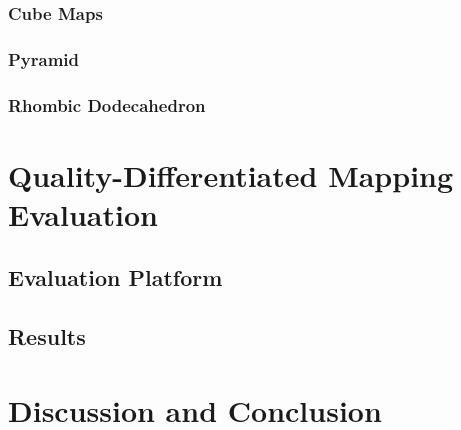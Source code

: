 \documentclass{sig-alternate}
\begin{document}
\subsubsection{Cube Maps}

\subsubsection{Pyramid}

\subsubsection{Rhombic Dodecahedron}

\section{Quality-Differentiated Mapping Evaluation}

\subsection{Evaluation Platform}

\subsection{Results}

\section{Discussion and Conclusion}

\newpage
%
%
  
%  

\end{document}
